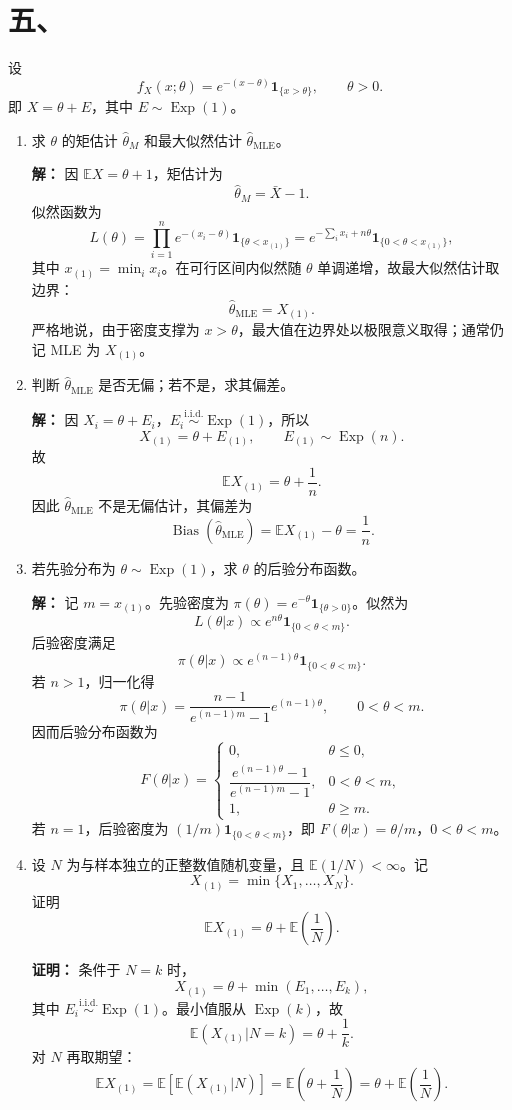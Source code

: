 \documentclass[UTF8,zihao=-4,fontset=windows]{ctexart}
\newcommand{\EX}{\mathbb E}
\newcommand{\iid}{\overset{\mathrm{i.i.d.}}{\sim}}
\newcommand{\Exp}{\operatorname{Exp}}
\newcommand{\ind}{\mathbf 1}
\newcommand{\ans}[1]{\textcolor{ansblue}{\textbf{#1}}}
\begin{document}
\section*{五、}
设
\[
  f_X(x;\theta)=e^{-(x-\theta)}\ind_{\{x>\theta\}},\qquad \theta>0.
\]
即 $X=\theta+E$，其中 $E\sim\Exp(1)$。

\begin{enumerate}
  \item 求 $\theta$ 的矩估计 $\hat\theta_M$ 和最大似然估计 $\hat\theta_{\mathrm{MLE}}$。

  \ans{解：} 因 $\EX X=\theta+1$，矩估计为
  \[
    \boxed{\hat\theta_M=\bar X-1.}
  \]
  似然函数为
  \[
    L(\theta)=\prod_{i=1}^n e^{-(x_i-\theta)}\ind_{\{\theta<x_{(1)}\}}
    =e^{-\sum_i x_i+n\theta}\ind_{\{0<\theta<x_{(1)}\}},
  \]
  其中 $x_{(1)}=\min_i x_i$。在可行区间内似然随 $\theta$ 单调递增，故最大似然估计取边界：
  \[
    \boxed{\hat\theta_{\mathrm{MLE}}=X_{(1)}.}
  \]
  严格地说，由于密度支撑为 $x>\theta$，最大值在边界处以极限意义取得；通常仍记 MLE 为 $X_{(1)}$。

  \item 判断 $\hat\theta_{\mathrm{MLE}}$ 是否无偏；若不是，求其偏差。

  \ans{解：} 因 $X_i=\theta+E_i$，$E_i\iid\Exp(1)$，所以
  \[
    X_{(1)}=\theta+E_{(1)},\qquad E_{(1)}\sim\Exp(n).
  \]
  故
  \[
    \EX X_{(1)}=\theta+\frac1n.
  \]
  因此 $\hat\theta_{\mathrm{MLE}}$ 不是无偏估计，其偏差为
  \[
    \operatorname{Bias}(\hat\theta_{\mathrm{MLE}})
    =\EX X_{(1)}-\theta=\frac1n.
  \]

  \item 若先验分布为 $\theta\sim \Exp(1)$，求 $\theta$ 的后验分布函数。

  \ans{解：} 记 $m=x_{(1)}$。先验密度为 $\pi(\theta)=e^{-\theta}\ind_{\{\theta>0\}}$。似然为
  \[
    L(\theta|x)\propto e^{n\theta}\ind_{\{0<\theta<m\}}.
  \]
  后验密度满足
  \[
    \pi(\theta|x)\propto e^{(n-1)\theta}\ind_{\{0<\theta<m\}}.
  \]
  若 $n>1$，归一化得
  \[
    \pi(\theta|x)=
    \frac{n-1}{e^{(n-1)m}-1}e^{(n-1)\theta},\qquad 0<\theta<m.
  \]
  因而后验分布函数为
  \[
    F(\theta|x)=
    \begin{cases}
      0, & \theta\le0,\\[0.3em]
      \dfrac{e^{(n-1)\theta}-1}{e^{(n-1)m}-1}, & 0<\theta<m,\\[0.9em]
      1, & \theta\ge m.
    \end{cases}
  \]
  若 $n=1$，后验密度为 $(1/m)\ind_{\{0<\theta<m\}}$，即 $F(\theta|x)=\theta/m$，$0<\theta<m$。

  \item 设 $N$ 为与样本独立的正整数值随机变量，且 $\EX(1/N)<\infty$。记
  \[
    X_{(1)}=\min\{X_1,\ldots,X_N\}.
  \]
  证明
  \[
    \EX X_{(1)}=\theta+\EX\left(\frac1N\right).
  \]

  \ans{证明：} 条件于 $N=k$ 时，
  \[
    X_{(1)}=\theta+\min(E_1,\ldots,E_k),
  \]
  其中 $E_i\iid\Exp(1)$。最小值服从 $\Exp(k)$，故
  \[
    \EX(X_{(1)}|N=k)=\theta+\frac1k.
  \]
  对 $N$ 再取期望：
  \[
    \EX X_{(1)}=\EX\left[\EX(X_{(1)}|N)\right]
    =\EX\left(\theta+\frac1N\right)
    =\theta+\EX\left(\frac1N\right).
  \]
\end{enumerate}
\end{document}

